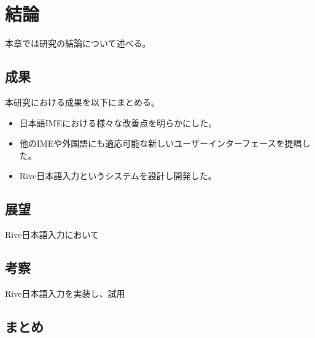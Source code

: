 \chapter{結論}
\label{chap:conclusion}
本章では研究の結論について述べる。

\newpage
\section{成果}
本研究における成果を以下にまとめる。
\begin{itemize}
  \item 日本語IMEにおける様々な改善点を明らかにした。
  \item 他のIMEや外国語にも適応可能な新しいユーザーインターフェースを提唱した。
  \item Rive日本語入力というシステムを設計し開発した。
\end{itemize}

\section{展望}
Rive日本語入力において

\section{考察}
Rive日本語入力を実装し、試用

\section{まとめ}

